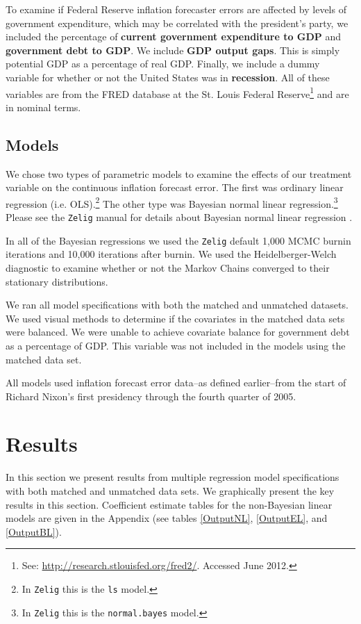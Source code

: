 \documentclass[a4paper]{article}\usepackage{graphicx, color}
\begin{document}
To examine if Federal Reserve inflation forecaster errors are affected by levels of government expenditure, which may be correlated with the president's party, we included the percentage of {\bf{current government expenditure to GDP}} and {\bf{government debt to GDP}}. We include {\bf{GDP output gaps}}. This is simply potential GDP as a percentage of real GDP. Finally, we include a dummy variable for whether or not the United States was in {\bf{recession}}. All of these variables are from the FRED database at the St. Louis Federal Reserve\footnote{See: {\url{http://research.stlouisfed.org/fred2/}}. Accessed June 2012.} and are in nominal terms.

\subsection{Models}

We chose two types of parametric models to examine the effects of our treatment variable on the continuous inflation forecast error. The first was ordinary linear regression (i.e. OLS).\footnote{In {\tt{Zelig}} this is the {\tt{ls}} model.} The other type was Bayesian normal linear regression.\footnote{In {\tt{Zelig}} this is the {\tt{normal.bayes}} model.} Please see the {\tt{Zelig}} manual for details about Bayesian normal linear regression \citep{Goodrich2007}. 

In all of the Bayesian regressions we used the {\tt{Zelig}} default 1,000 MCMC burnin iterations and 10,000 iterations after burnin. We used the Heidelberger-Welch diagnostic to examine whether or not the Markov Chains converged to their stationary distributions.

We ran all model specifications with both the matched and unmatched datasets. We used visual methods to determine if the covariates in the matched data sets were balanced. We were unable to achieve covariate balance for government debt as a percentage of GDP. This variable was not included in the models using the matched data set.

All models used inflation forecast error data--as defined earlier--from the start of Richard Nixon's first presidency through the fourth quarter of 2005. 

\section{Results}

In this section we present results from multiple regression model specifications with both matched and unmatched data sets. We graphically present the key results in this section. Coefficient estimate tables for the non-Bayesian linear models are given in the Appendix (see tables \ref{OutputNL}, \ref{OutputEL}, and \ref{OutputBL}).
\end{document}

